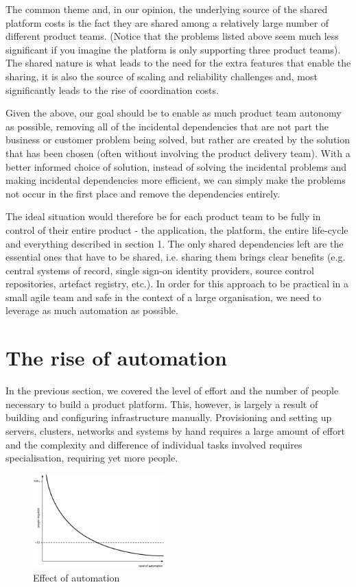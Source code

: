 \documentclass[reprint,amsmath,amssymb,aps]{revtex4-1}
\begin{document}
The common theme and, in our opinion, the underlying source of the shared platform costs is the fact they are shared among a relatively large number of different product teams. (Notice that the problems listed above seem much less significant if you imagine the platform is only supporting three product teams). The shared nature is what leads to the need for the extra features that enable the sharing, it is also the source of scaling and reliability challenges and, most significantly leads to the rise of coordination costs.

Given the above, our goal should be to enable as much product team autonomy as possible, removing all of the incidental dependencies that are not part the business or customer problem being solved, but rather are created by the solution that has been chosen (often without involving the product delivery team). With a better informed choice of solution, instead of solving the incidental problems and making incidental dependencies more efficient, we can simply make the problems not occur in the first place and remove the dependencies entirely.

The ideal situation would therefore be for each product team to be fully in control of their entire product - the application, the platform, the entire life-cycle and everything described in section 1. The only shared dependencies left are the essential ones that have to be shared, i.e. sharing them brings clear benefits (e.g. central systems of record, single sign-on identity providers, source control repositories, artefact registry, etc.). In order for this approach to be practical in a small agile team and safe in the context of a large organisation, we need to leverage as much automation as possible.


\section{The rise of automation}
\label{sec:automation}

In the previous section, we covered the level of effort and the number of people necessary to build a product platform. This, however, is largely a result of building and configuring infrastructure manually. Provisioning and setting up servers, clusters, networks and systems by hand requires a large amount of effort and the complexity and difference of individual tasks involved requires specialisation, requiring yet more people.
 
\begin{figure}[h]
        \includegraphics[width=0.45\textwidth]{figs/automation}
        \caption{Effect of automation}
        \label{fig:automationn}
\end{figure}
\end{document}
